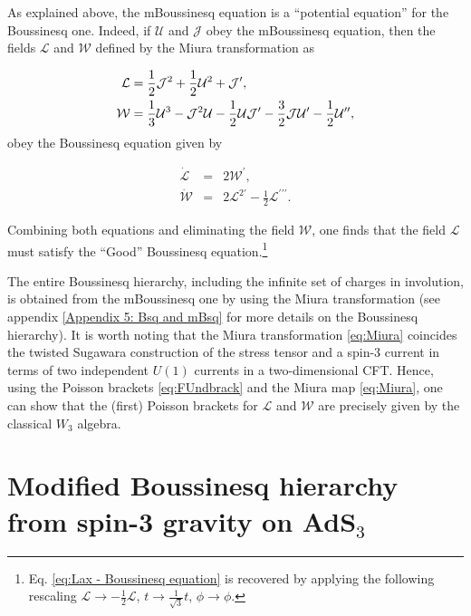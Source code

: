 \documentclass[letterpaper,11pt,oneside]{book}
\begin{document}
As explained above, the mBoussinesq equation is a ``potential equation''
for the Boussinesq one. Indeed, if $\mathcal{U}$ and $\mathcal{J}$
obey the mBoussinesq equation, then the fields $\mathcal{L}$ and
$\mathcal{W}$ defined by the Miura transformation as

\begin{align}
	\mathcal{L} & =\frac{1}{2}{\cal J}^{2}+\frac{1}{2}\mathcal{U}^{2}+{\cal J}^{\prime},\nonumber \\
	\mathcal{W} & =\frac{1}{3}\mathcal{U}^{3}-{\cal J}^{2}\mathcal{U}-\frac{1}{2}\mathcal{U}{\cal J}^{\prime}-\frac{3}{2}{\cal J}{\cal U}^{\prime}-\frac{1}{2}{\cal U}^{\prime\prime},\label{eq:Miura}
\end{align}
obey the Boussinesq equation given by

\begin{eqnarray}
	\dot{\mathcal{L}} & = & 2\mathcal{W}^{\prime},\nonumber \\
	\dot{\mathcal{W}} & = & 2\mathcal{L}^{2\prime}-\frac{1}{2}\mathcal{L}^{\prime\prime\prime}.\label{eq:Bsqeq}
\end{eqnarray}

Combining both equations and eliminating the field $\mathcal{W}$, one finds that the field $\mathcal{L}$ must satisfy the ``Good'' Boussinesq
equation.\footnote{Eq. \eqref{eq:Lax - Boussinesq equation} is recovered by applying the following rescaling $\mathcal{L} \rightarrow -\frac{1}{2}\mathcal{L}$, $t \rightarrow \frac{1}{\sqrt{3}}t $,  $\phi  \rightarrow \phi  $.}


The entire Boussinesq hierarchy, including the infinite set of charges
in involution, is obtained from the mBoussinesq one by using the Miura
transformation (see appendix \ref{Appendix 5: Bsq and mBsq}\textcolor{red}{{}
}for more details on the Boussinesq hierarchy). It is worth noting
that the Miura transformation \eqref{eq:Miura} coincides the twisted
Sugawara construction of the stress tensor and a spin-3 current in
terms of two independent $U\left(1\right)$ currents in a two-dimensional
CFT. Hence, using the Poisson brackets \eqref{eq:FUndbrack} and the
Miura map \eqref{eq:Miura}, one can show that the (first) Poisson
brackets for $\mathcal{L}$ and $\mathcal{W}$ are precisely given
by the classical $W_{3}$ algebra.

\section{Modified Boussinesq hierarchy from spin-3 gravity on AdS$_{3}$\label{sec:2 mBq hierarchy from gravity on AdS}}
\end{document}
